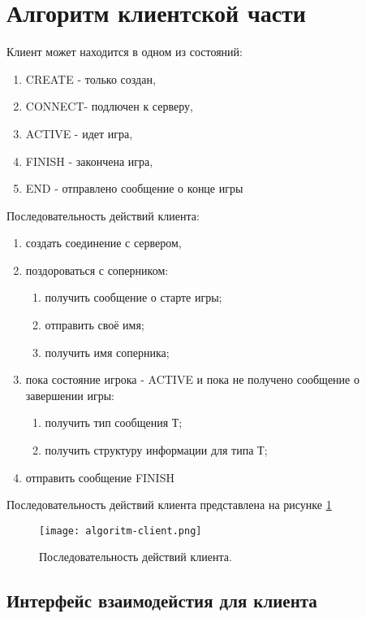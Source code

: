 \section{Алгоритм клиентской части}

Клиент может находится в одном из состояний:
\begin{enumerate}
\item CREATE - только создан,
\item CONNECT- подлючен к серверу,
\item ACTIVE - идет игра,
\item FINISH - закончена игра,
\item END - отправлено сообщение о конце игры
\end{enumerate}

Последовательность действий клиента:
\begin{enumerate}
\item создать соединение с сервером,
\item поздороваться с соперником:
  \begin{enumerate}
  \item получить сообщение о старте игры;
  \item отправить своё имя;
  \item получить имя соперника;
  \end{enumerate}
\item пока состояние игрока - ACTIVE и пока не получено сообщение о завершении игры:
  \begin{enumerate}
  \item получить тип сообщения Т;
  \item получить структуру информации для типа Т;
  \end{enumerate}
\item отправить сообщение FINISH
\end{enumerate}

Последовательность действий клиента представлена на рисунке \ref{image:algoritm-client}

\begin{figure}[h]
  \centering
  \texttt{[image: algoritm-client.png]}
  \caption{Последовательность действий клиента.}
  \label{image:algoritm-client}
\end{figure}

\subsection{Интерфейс взаимодейстия для клиента}

